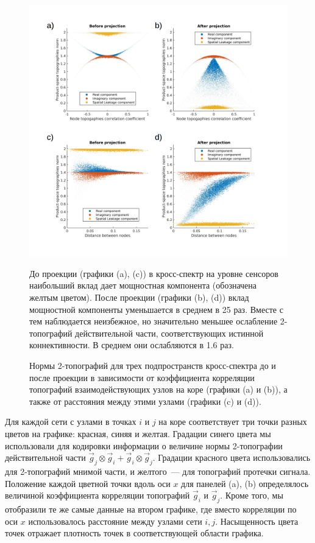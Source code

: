 \begin{figure}[!ht]
 \includegraphics[width=1\textwidth]{../images/psiicos_paper/Figure3abcd_hr}
 \caption{Нормы 2-топографий для трех подпространств кросс-спектра до и после проекции
     в зависимости от коэффициента корреляции топографий взаимодействующих
     узлов на коре (графики (a) и (b)), а также от расстояния между
     этими узлами (графики (c) и (d)).}\label{fig:02} %
     До проекции (графики (a), (c)) в кросс-спектр на уровне сенсоров наибольший вклад дает мощностная
     компонента (обозначена желтым цветом). После проекции (графики (b), (d))
     вклад мощностной компоненты уменьшается в среднем в 25 раз. Вместе с
     тем наблюдается неизбежное, но значительно меньшее ослабление
     2-топографий действительной части, соответствующих истинной коннективности.
     В среднем они ослабляются в 1.6 раз.
\end{figure}

Для каждой сети с узлами в точках $i$ и $j$ на коре соответствует три точки
разных цветов на графике: красная, синяя и желтая. Градации синего цвета мы
использовали для кодировки информации о величине нормы 2-топографии
действительной части $\vec{g}_j\otimes\vec{g}_i + \vec{g}_i\otimes\vec{g}_j$.
Градации красного цвета использовались для 2-топографий мнимой части, и
желтого~--- для топографий протечки сигнала.  Положение каждой цветной точки
вдоль оси $x$ для панелей (a), (b) определялось величиной коэффициента
корреляции топографий $\vec{g}_i$ и $\vec{g}_j$.  Кроме того, мы отобразили те
же самые данные на втором графике, где вместо корреляции по оси $x$
использовалось расстояние между узлами сети $i, j$. Насыщенность цвета точек
отражает плотность точек в соответствующей области графика.

